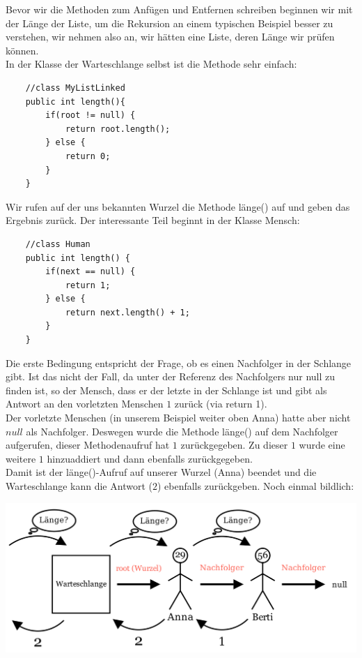 \documentclass{article}
\begin{document}
Bevor wir die Methoden zum Anfügen und Entfernen schreiben beginnen wir mit der Länge der Liste, um die 
Rekursion an einem typischen Beispiel besser zu verstehen, 
wir nehmen also an, wir hätten eine Liste, deren Länge wir prüfen können. \\
In der Klasse der Warteschlange selbst ist die Methode sehr einfach: 
\begin{verbatim}
    //class MyListLinked
    public int length(){
        if(root != null) {
            return root.length();
        } else {
            return 0;
        }
    }
\end{verbatim}
Wir rufen auf der uns bekannten Wurzel die Methode länge() auf und geben das Ergebnis zurück. Der interessante
Teil beginnt in der Klasse Mensch: 
\begin{verbatim}
    //class Human
    public int length() {
        if(next == null) {
            return 1;
        } else {
            return next.length() + 1;
        }
    }
\end{verbatim}
Die erste Bedingung entspricht der Frage, ob es einen Nachfolger in der Schlange gibt. Ist das nicht der Fall, 
da unter der Referenz des Nachfolgers nur null zu finden ist, so  der Mensch, dass er der letzte in der Schlange 
ist und gibt als Antwort an den vorletzten Menschen $1$ zurück (via return 1). \\
Der vorletzte Menschen (in unserem Beispiel weiter oben Anna) hatte aber nicht $null$ als Nachfolger. 
Deswegen wurde die Methode länge() auf dem Nachfolger aufgerufen, dieser Methodenaufruf hat $1$ zurückgegeben. 
Zu dieser $1$ wurde eine weitere $1$ hinzuaddiert und dann ebenfalls zurückgegeben. \\
Damit ist der länge()-Aufruf auf unserer Wurzel (Anna) beendet und die Warteschlange kann die Antwort 
($2$) ebenfalls zurückgeben. Noch einmal bildlich: 
\begin{center}
    \includegraphics[scale = 0.20]{../../media/linked_list_length3.png}
\end{center}
\end{document}
